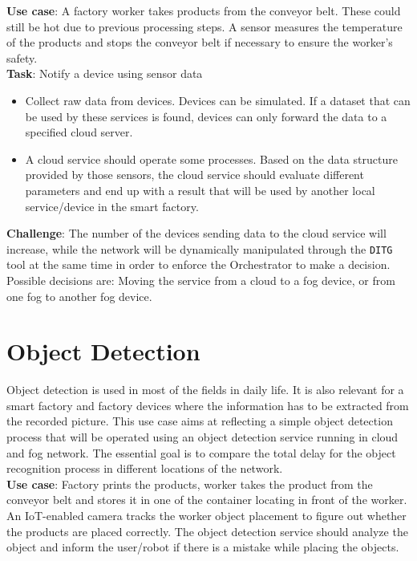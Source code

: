\textbf{Use case}:
A factory worker takes products from the conveyor belt.
These could still be hot due to previous processing steps.
A sensor measures the temperature of the products and stops the conveyor belt if necessary to ensure the worker's safety.\\

\textbf{Task}: Notify a device using sensor data
\begin{itemize}
    \item Collect raw data from devices. Devices can be simulated. If a dataset that can be used by these services is found, devices can only forward the data to a specified cloud server.
    \item A cloud service should operate some processes. Based on the data structure provided by those sensors, the cloud service should evaluate different parameters and end up with a result that will be used by another local service/device in the smart factory.\\
\end{itemize}

\textbf{Challenge}: The number of the devices sending data to the cloud service will increase, while the network will be dynamically manipulated through the \texttt{DITG} tool at the same time in order to enforce the Orchestrator to make a decision.
Possible decisions are: Moving the service from a cloud to a fog device, or from one fog to another fog device.

\section{Object Detection}
Object detection is used in most of the fields in daily life.
It is also relevant for a smart factory and factory devices where the information has to be extracted from the recorded picture.
This use case aims at reflecting a simple object detection process that will be operated using an object detection service running in cloud and fog network.
The essential goal is to compare the total delay for the object recognition process in different locations of the network.\\

\textbf{Use case}: Factory prints the products, worker takes the product from the conveyor belt and stores it in one of the container locating in front of the worker.
An IoT-enabled camera tracks the worker object placement to figure out whether the products are placed correctly.
The object detection service should analyze the object and inform the user/robot if there is a mistake while placing the objects.\\

